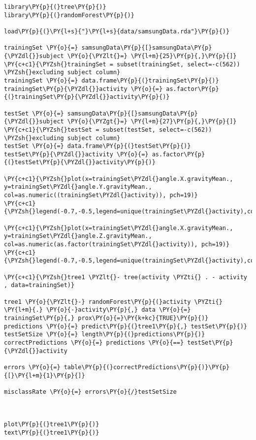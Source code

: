 \begin{Verbatim}[commandchars=\\\{\}]
library\PY{p}{(}tree\PY{p}{)}
library\PY{p}{(}randomForest\PY{p}{)}

load\PY{p}{(}\PY{l+s}{"}\PY{l+s}{data/samsungData.rda"}\PY{p}{)}

trainingSet \PY{o}{=} samsungData\PY{p}{[}samsungData\PY{p}{\PYZdl{}}subject \PY{o}{\PYZlt{}=} \PY{l+m}{25}\PY{p}{,}\PY{p}{]} 
\PY{c+c1}{\PYZsh{}trainingSet = subset(trainingSet, select=-c(562)) \PYZsh{}excluding subject column}
trainingSet \PY{o}{=} data.frame\PY{p}{(}trainingSet\PY{p}{)}
trainingSet\PY{p}{\PYZdl{}}activity \PY{o}{=} as.factor\PY{p}{(}trainingSet\PY{p}{\PYZdl{}}activity\PY{p}{)}

testSet \PY{o}{=} samsungData\PY{p}{[}samsungData\PY{p}{\PYZdl{}}subject \PY{o}{\PYZgt{}=} \PY{l+m}{27}\PY{p}{,}\PY{p}{]}
\PY{c+c1}{\PYZsh{}testSet = subset(testSet, select=-c(562)) \PYZsh{}excluding subject column}
testSet \PY{o}{=} data.frame\PY{p}{(}testSet\PY{p}{)}
testSet\PY{p}{\PYZdl{}}activity \PY{o}{=} as.factor\PY{p}{(}testSet\PY{p}{\PYZdl{}}activity\PY{p}{)}

\PY{c+c1}{\PYZsh{}plot(x=trainingSet\PYZdl{}angle.X.gravityMean., y=trainingSet\PYZdl{}angle.Y.gravityMean., col=as.numeric((trainingSet\PYZdl{}activity)), pch=19)}
\PY{c+c1}{\PYZsh{}legend(-0.7,-0.5,legend=unique(trainingSet\PYZdl{}activity),col=unique(as.numeric(as.factor(trainingSet\PYZdl{}activity))),pch=19)}

\PY{c+c1}{\PYZsh{}plot(x=trainingSet\PYZdl{}angle.X.gravityMean., y=trainingSet\PYZdl{}angle.Z.gravityMean., col=as.numeric(as.factor(trainingSet\PYZdl{}activity)), pch=19)}
\PY{c+c1}{\PYZsh{}legend(-0.7,-0.5,legend=unique(trainingSet\PYZdl{}activity),col=unique(as.numeric((trainingSet\PYZdl{}activity))),pch=19)}

\PY{c+c1}{\PYZsh{}tree1 \PYZlt{}- tree(activity \PYZti{} . - activity , data=trainingSet)}

tree1 \PY{o}{\PYZlt{}-} randomForest\PY{p}{(}activity \PYZti{} \PY{l+m}{.} \PY{o}{-}activity\PY{p}{,} data \PY{o}{=} trainingSet\PY{p}{,} prox\PY{o}{=}\PY{k+kc}{TRUE}\PY{p}{)}
predictions \PY{o}{=} predict\PY{p}{(}tree1\PY{p}{,} testSet\PY{p}{)}
testSetSize \PY{o}{=} length\PY{p}{(}predictions\PY{p}{)}
correctPredictions \PY{o}{=} predictions \PY{o}{==} testSet\PY{p}{\PYZdl{}}activity

errors \PY{o}{=} table\PY{p}{(}correctPredictions\PY{p}{)}\PY{p}{[}\PY{l+m}{1}\PY{p}{]}

misclassRate \PY{o}{=} errors\PY{o}{/}testSetSize



plot\PY{p}{(}tree1\PY{p}{)}
text\PY{p}{(}tree1\PY{p}{)}
\end{Verbatim}
